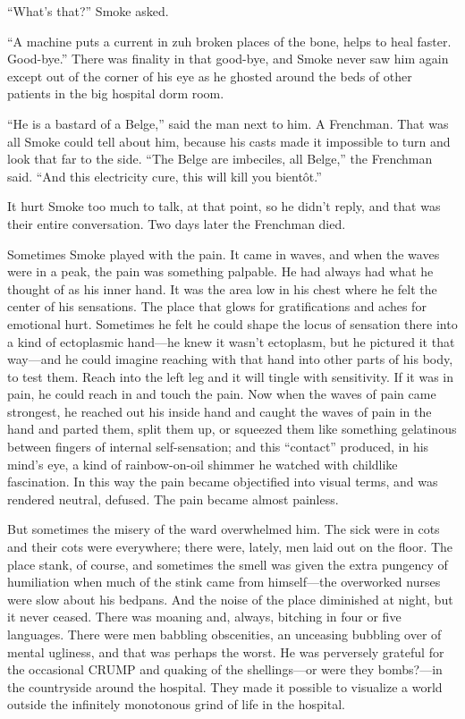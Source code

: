 “What’s that?” Smoke asked.

“A machine puts a current in zuh broken places of the bone, helps to heal faster. Good-bye.” There was finality in that good-bye, and Smoke never saw him again except out of the corner of his eye as he ghosted around the beds of other patients in the big hospital dorm room.

“He is a bastard of a Belge,” said the man next to him. A Frenchman. That was all Smoke could tell about him, because his casts made it impossible to turn and look that far to the side. “The Belge are imbeciles, all Belge,” the Frenchman said. “And this electricity cure, this will kill you bientôt.”

It hurt Smoke too much to talk, at that point, so he didn’t reply, and that was their entire conversation. Two days later the Frenchman died.

Sometimes Smoke played with the pain. It came in waves, and when the waves were in a peak, the pain was something palpable. He had always had what he thought of as his inner hand. It was the area low in his chest where he felt the center of his sensations. The place that glows for gratifications and aches for emotional hurt. Sometimes he felt he could shape the locus of sensation there into a kind of ectoplasmic hand—he knew it wasn’t ectoplasm, but he pictured it that way—and he could imagine reaching with that hand into other parts of his body, to test them. Reach into the left leg and it will tingle with sensitivity. If it was in pain, he could reach in and touch the pain. Now when the waves of pain came strongest, he reached out his inside hand and caught the waves of pain in the hand and parted them, split them up, or squeezed them like something gelatinous between fingers of internal self-sensation; and this “contact” produced, in his mind’s eye, a kind of rainbow-on-oil shimmer he watched with childlike fascination. In this way the pain became objectified into visual terms, and was rendered neutral, defused. The pain became almost painless.

But sometimes the misery of the ward overwhelmed him. The sick were in cots and their cots were everywhere; there were, lately, men laid out on the floor. The place stank, of course, and sometimes the smell was given the extra pungency of humiliation when much of the stink came from himself—the overworked nurses were slow about his bedpans. And the noise of the place diminished at night, but it never ceased. There was moaning and, always, bitching in four or five languages. There were men babbling obscenities, an unceasing bubbling over of mental ugliness, and that was perhaps the worst. He was perversely grateful for the occasional CRUMP and quaking of the shellings—or were they bombs?—in the countryside around the hospital. They made it possible to visualize a world outside the infinitely monotonous grind of life in the hospital.

